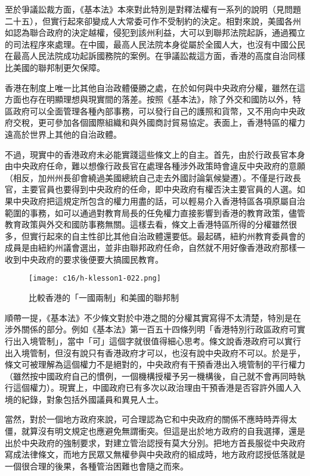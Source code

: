 至於爭議訟裁方面，《基本法》本來對此特別是對釋法權有一系列的說明（見問題二十五），但實行起來卻變成人大常委可作不受制約的決定。相對來說，美國各州如認為聯合政府的決定越權，侵犯到該州利益，大可以到聯邦法院起訴，通過獨立的司法程序來處理。在中國，最高人民法院本身從屬於全國人大，也沒有中國公民在最高人民法院成功起訴國務院的案例。在爭議訟裁這方面，香港的高度自治同樣比美國的聯邦制更欠保障。

香港在制度上唯一比其他自治政體優勝之處，在於如何與中央政府分權，雖然在這方面也存在明顯理想與現實間的落差。按照《基本法》，除了外交和國防以外，特區政府可以全面管理各種內部事務，可以發行自己的護照和貨幣，又不用向中央政府交稅，更可參加各個國際組織和與外國商討貿易協定。表面上，香港特區的權力遠高於世界上其他的自治政體。

不過，現實中的香港政府未必能實踐這些條文上的自主。首先，由於行政長官本身由中央政府任命，難以想像行政長官在處理各種涉外政策時會違反中央政府的意願（相反，加州州長卻會繞過美國總統自己走去外國討論氣候變遷）。不僅是行政長官，主要官員也要得到中央政府的任命，即中央政府有權否決主要官員的人選。如果中央政府把這規定所包含的權力用盡的話，可以輕易介入香港特區各項原屬自治範圍的事務，如可以通過對教育局長的任免權力直接影響到香港的教育政策，儘管教育政策與外交和國防事務無關。這樣去看，條文上香港特區所得的分權雖然很多，但實行起來的自主性卻比其他自治政體還要低。最起碼，紐約州教育委員會的成員是由紐約州議會選出，並非由聯邦政府任命，自然就不用好像香港政府那樣一收到中央政府的要求後便要大搞國民教育。

\begin{figure}[htbp]
    \centering
    \texttt{[image: c16/h-klesson1-022.png]}
    \caption{比較香港的「一國兩制」和美國的聯邦制} 
\end{figure}

順帶一提，《基本法》不少條文對於中港之間的分權其實寫得不太清楚，特別是在涉外關係的部分。例如《基本法》第一百五十四條列明「香港特別行政區政府可實行出入境管制」，當中「可」這個字就很值得細心思考。條文說香港政府可以實行出入境管制，但沒有說只有香港政府才可以，也沒有說中央政府不可以。於是乎，條文可被理解為這個權力不是絕對的，中央政府有干預香港出入境管制的平行權力（雖然按中國政府自己的慣例，一個機構授權予另一機構後，自己就不會再同時執行這個權力）。現實上，中國政府已有多次以政治理由干預香港是否容許外國人入境的紀錄，對象包括外國議員和異見人士。

當然，對於一個地方政府來說，可合理認為它和中央政府的關係不應時時弄得太僵，就算沒有明文規定也應避免無謂衝突。但這是出於地方政府的自我選擇，還是出於中央政府的強制要求，對建立管治認授有莫大分別。把地方首長服從中央政府寫成法律條文，而地方民眾又無權參與中央政府的組成時，地方政府認授低落就是一個很合理的後果，各種管治困難也會隨之而來。

